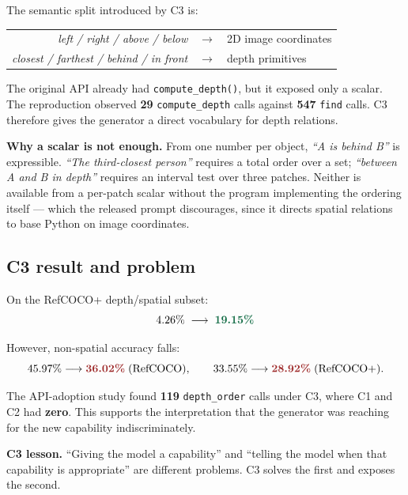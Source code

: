 \documentclass[11pt,a4paper]{article}
\newcommand{\up}[1]{\textcolor{good}{\textbf{#1}}}
\newcommand{\down}[1]{\textcolor{bad}{\textbf{#1}}}
\begin{document}
The semantic split introduced by C3 is:
\begin{center}
\begin{tabular}{@{}rcl@{}}
\emph{left / right / above / below} & $\rightarrow$ & 2D image coordinates \\
\emph{closest / farthest / behind / in front} & $\rightarrow$ & depth primitives \\
\end{tabular}
\end{center}

The original API already had \texttt{compute\_depth()}, but it exposed only a scalar.
The reproduction observed \textbf{29} \texttt{compute\_depth} calls against
\textbf{547} \texttt{find} calls. C3 therefore gives the generator a direct vocabulary
for depth relations.

\begin{callout}
\textbf{Why a scalar is not enough.} From one number per object, \emph{``A is behind
B''} is expressible. \emph{``The third-closest person''} requires a total order over a
set; \emph{``between A and B in depth''} requires an interval test over three patches.
Neither is available from a per-patch scalar without the program implementing the
ordering itself --- which the released prompt discourages, since it directs spatial
relations to base Python on image coordinates.
\end{callout}

\subsection{C3 result and problem}

On the RefCOCO+ depth/spatial subset:
\[
    4.26\% \;\longrightarrow\; \up{19.15\%}
\]

However, non-spatial accuracy falls:
\[
    45.97\% \longrightarrow \down{36.02\%} \;\text{(RefCOCO)},
    \qquad
    33.55\% \longrightarrow \down{28.92\%} \;\text{(RefCOCO+)}.
\]

The API-adoption study found \textbf{119} \texttt{depth\_order} calls under C3, where
C1 and C2 had \textbf{zero}. This supports the interpretation that the generator was
reaching for the new capability indiscriminately.

\begin{finding}
\textbf{C3 lesson.} ``Giving the model a capability'' and ``telling the model when
that capability is appropriate'' are different problems. C3 solves the first and
exposes the second.
\end{finding}
\end{document}
